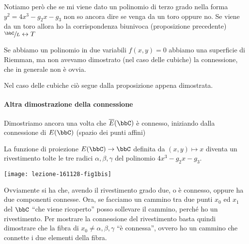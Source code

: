 \begin{osservazione}
  Notiamo però che se mi viene dato un polinomio di terzo grado nella
  forma $y^2 = 4x^3 - g_2 x - g_3$ non so ancora dire se venga da un
  toro oppure no. Se viene da un toro allora ho la corrispondenza
  biunivoca (proposizione precedente) $\sfrac{\bbC}{L} \leftrightarrow T$
\end{osservazione}

\begin{osservazione}
  Se abbiamo un polinomio in due variabili $f(x, y) = 0$ abbiamo una
  superficie di Riemman, ma non avevamo dimostrato (nel caso delle
  cubiche) la connessione, che in generale non è ovvia.

  Nel caso delle cubiche ciò segue dalla proposizione appena dimostrata.
\end{osservazione}

\paragraph{Altra dimostrazione della connessione} Dimostriamo ancora una
volta che $\ol{E}(\bbC)$ è connesso, iniziando dalla connessione di
$E(\bbC)$ (spazio dei punti affini)


La funzione di proiezione $E(\bbC) \rar \bbC$ definita da $(x, y) \mapsto x$ 
diventa un rivestimento tolte le tre radici $\alpha, \beta, \gamma$ del
polinomio $4x^3 - g_2 x - g_3$.


\begin{center}
  \texttt{[image: lezione-161128-fig1bis]}
\end{center}


Ovviamente si ha che, avendo il rivestimento grado due, o è connesso,
oppure ha due componenti connesse. Ora, se facciamo un cammino tra due
punti $x_0$ ed $x_1$ del $\bbC$ ``che viene ricoperto'' posso sollevare
il cammino, perché ho un rivestimento. Per mostrare la connessione del
rivestimento basta quindi dimostrare che la fibra di $x_0 \neq \alpha,
\beta, \gamma$ ``è connessa'', ovvero ho un cammino che connette i due
elementi della fibra.

